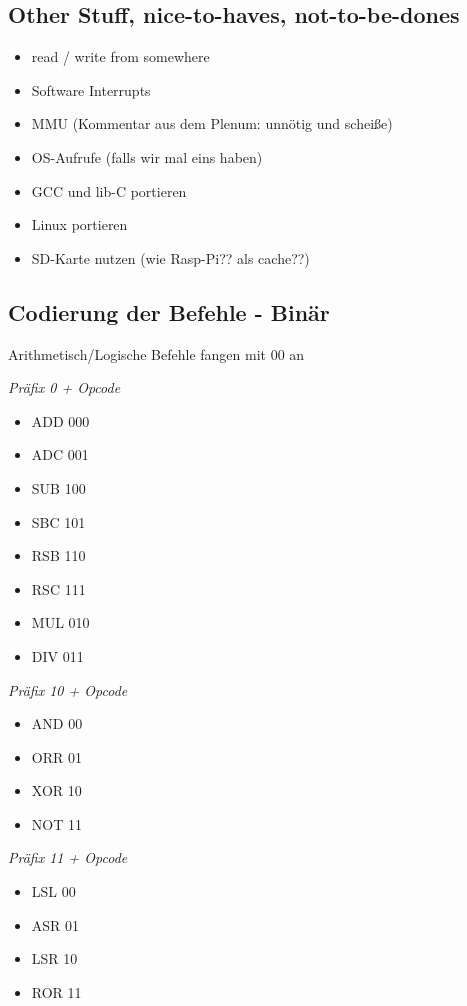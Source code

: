 \documentclass[a4paper]{article}
\begin{document}
\subsection{Other Stuff, nice-to-haves, not-to-be-dones}

\begin{itemize}
\item read / write from somewhere
\item Software Interrupts
\item MMU (Kommentar aus dem Plenum: unnötig und scheiße)
\item OS-Aufrufe (falls wir mal eins haben)
\item GCC und lib-C portieren
\item Linux portieren
\item SD-Karte nutzen (wie Rasp-Pi?? als cache??)
\end{itemize}

\subsection{Codierung der Befehle - Binär}
Arithmetisch/Logische Befehle fangen mit 00 an
\begin{multicols}{2}
\emph{Präfix 0 + {Opcode}}
\begin{itemize}
\item ADD 000
\item ADC 001
\item SUB 100
\item SBC 101
\item RSB 110
\item RSC 111

\item MUL 010
\item DIV 011
\end{itemize}

\emph{Präfix 10 + {Opcode}}
\begin{itemize}
\item AND 00
\item ORR 01
\item XOR 10
\item NOT 11
\end{itemize}

\emph{Präfix 11 + {Opcode}}
\begin{itemize}
\item LSL 00
\item ASR 01
\item LSR 10
\item ROR 11
\end{itemize}


\end{multicols}
\end{document}
